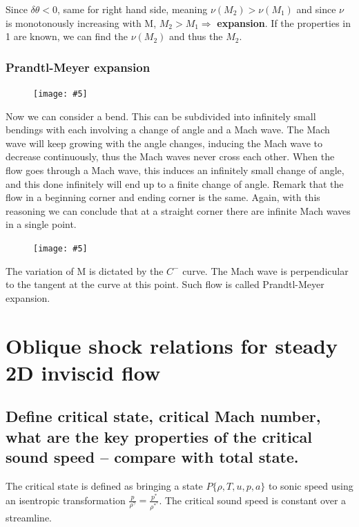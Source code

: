 \documentclass[british,french,11pt, a4paper, openany]{article}
\newcommand{\wrapfig}[6]{%
	\begin{figure}%
		\vspace{-5mm}%
		\texttt{[image: \#5]}%
		\captionof{figure}{}%
		\label{#6}%
	\end{figure}%
}
\begin{document}
Since $\delta \theta < 0$, same for right hand side, meaning $\nu (M_2)>\nu (M_1)$ and since $\nu$ is monotonously increasing with M, $M_2 > M_1 \Rightarrow$ \textbf{expansion}. If the properties in 1 are known, we can find the $\nu (M_2)$ and thus the $M_2$.

\subsubsection{Prandtl-Meyer expansion}

\wrapfig{11}{l}{6}{0.1}{ch8/27}{ch8/27}
Now we can consider a bend. This can be subdivided into infinitely small bendings with each involving a change of angle and a Mach wave. The Mach wave will keep growing with the angle changes, inducing the Mach wave to decrease continuously, thus the Mach waves never cross each other. When the flow goes through a Mach wave, this induces an infinitely small change of angle, and this done infinitely will end up to a finite change of angle. Remark that the flow in a beginning corner and ending corner is the same.  Again, with this reasoning we can conclude that at a straight corner there are infinite Mach waves in a single point. 

\wrapfig{9}{r}{4}{0.15}{ch8/28}{ch8/28}
The variation of M is dictated by the $C^-$ curve. The Mach wave is perpendicular to the tangent at the curve at this point. Such flow is called Prandtl-Meyer expansion. 




\section{Oblique shock relations for steady 2D inviscid flow}
\subsection{Define critical state, critical Mach number, what are the key properties of the critical sound speed – compare with total state.}

The critical state is defined as bringing a state $P\{\rho,T,u,p,a\}$ to sonic speed using an isentropic transformation $\frac{p}{\rho ^{\gamma}}=\frac{p^*}{\rho ^{*^\gamma}}$. The critical sound speed is constant over a streamline.
\end{document}
